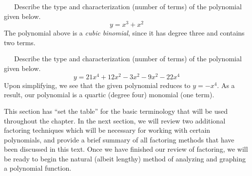 \begin{example}~~~Describe the type and characterization (number of terms) of the polynomial given below.
$$y = x^3+x^2$$
The polynomial above is a \textit{cubic binomial}, since it has degree three and contains two terms. 
\end{example}

\begin{example}~~~Describe the type and characterization (number of terms) of the polynomial given below.
$$y = 21x^4+12x^2-3x^2-9x^2-22x^4$$
Upon simplifying, we see that the given polynomial reduces to $y=-x^4$.  As a result, our polynomial is a quartic (degree four) monomial (one term).
\end{example}
This section has ``set the table'' for the basic terminology that will be used throughout the chapter.  In the next section, we will review two additional factoring techniques which will be necessary for working with certain polynomials, and provide a brief summary of all factoring methods that have been discussed in this text.  Once we have finished our review of factoring, we will be ready to begin the natural (albeit lengthy) method of analyzing and graphing a polynomial function. 
